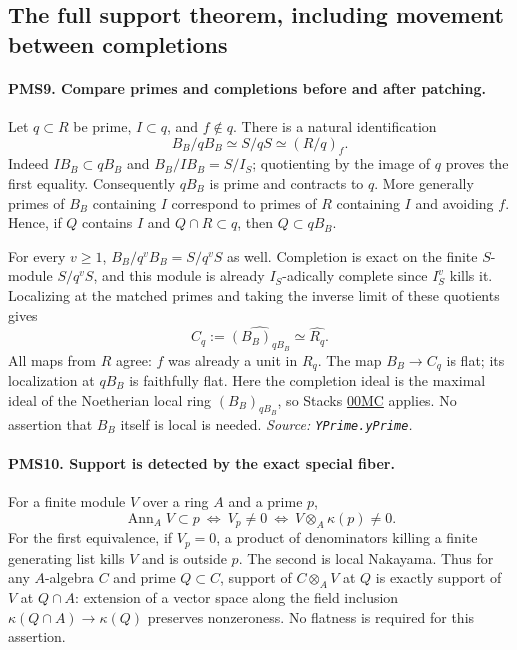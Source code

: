 \subsection{The full support theorem, including movement between completions}

\paragraph{PMS9. Compare primes and completions before and after patching.}
\label{claim:PMS9}
Let $q\subset R$ be prime, $I\subset q$, and $f\notin q$.
There is a natural identification
\[
 B_B/qB_B\simeq S/qS\simeq (R/q)_f.             \tag{PMS.17}
\]
Indeed $IB_B\subset qB_B$ and $B_B/IB_B=S/I_S$;
quotienting by the image of $q$ proves the first equality.
Consequently $qB_B$ is prime and contracts to $q$.
More generally primes of $B_B$ containing $I$ correspond to
primes of $R$ containing $I$ and avoiding $f$.  Hence, if $Q$
contains $I$ and $Q\cap R\subset q$, then $Q\subset qB_B$.

For every $v\geq1$,
$B_B/q^vB_B=S/q^vS$ as well.  Completion is exact on the finite
$S$-module $S/q^vS$, and this module is already $I_S$-adically
complete since $I_S^v$ kills it.  Localizing at the matched
primes and taking the inverse limit of these quotients gives
\[
 C_q:=\widehat{(B_B)_{qB_B}}
       \simeq\widehat{R_q}.                      \tag{PMS.18}
\]
All maps from $R$ agree: $f$ was already a unit in $R_q$.
The map $B_B\to C_q$ is flat; its localization at $qB_B$ is
faithfully flat.  Here the completion ideal is the maximal ideal
of the Noetherian local ring $(B_B)_{qB_B}$, so Stacks
\href{https://stacks.math.columbia.edu/tag/00MC}{00MC} applies.
No assertion that $B_B$ itself is local is needed.
\hfill\textit{Source: \texttt{YPrime.yPrime}.}

\paragraph{PMS10. Support is detected by the exact special fiber.}
\label{claim:PMS10}
For a finite module $V$ over a ring $A$ and a prime $p$,
\[
 \operatorname{Ann}_A V\subset p
 \ \Longleftrightarrow\ V_p\ne0
 \ \Longleftrightarrow\ V\otimes_A\kappa(p)\ne0.                \tag{PMS.19}
\]
For the first equivalence, if $V_p=0$, a product of denominators
killing a finite generating list kills $V$ and is outside $p$.
The second is local Nakayama.  Thus for any $A$-algebra $C$ and
prime $Q\subset C$, support of $C\otimes_A V$ at $Q$ is exactly
support of $V$ at $Q\cap A$: extension of a vector space along
the field inclusion $\kappa(Q\cap A)\to\kappa(Q)$ preserves
nonzeroness.  No flatness is required for this assertion.

